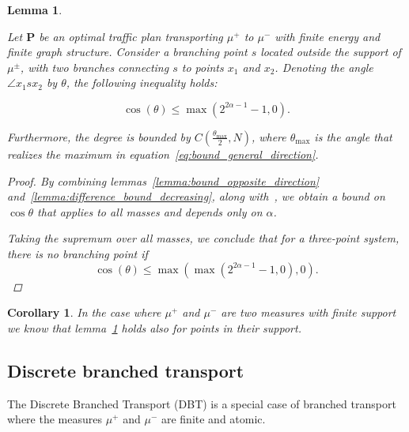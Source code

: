 \documentclass[11pt,reqno,a4paper]{amsart}
\numberwithin{equation}{section}
\theoremstyle{mytheorem}
\newtheorem{lemma}[subsection]{Lemma}
\newtheorem{corollary}[subsection]{Corollary}
\theoremstyle{myremark}
\theoremstyle{myparagraph}
\begin{document}
    \begin{lemma}
        \label{lemma:bound_general_direction}

        Let $\mathbf{P}$ be an optimal traffic plan transporting $\mu^+$ to $\mu^-$ with finite energy and finite graph structure.
        Consider a branching point $s$ located outside the support of $\mu^{\pm}$, with two branches connecting $s$ to points $x_1$ and $x_2$.
        Denoting the angle $\angle x_1 s x_2$ by $\theta$, the following inequality holds:

        \begin{equation}
            \label{eq:bound_general_direction}
            \cos(\theta) \le \max\left( 2^{2\alpha - 1} - 1, 0 \right).
        \end{equation}

        Furthermore, the degree is bounded by $C \left( \frac{\theta_{\max}}{2}, N \right)$, where $\theta_{\max}$
        is the angle that realizes the maximum in equation~\ref{eq:bound_general_direction}.

        \begin{proof}
            By combining lemmas~\ref{lemma:bound_opposite_direction} and~\ref{lemma:difference_bound_decreasing}, along with~\cite[Lemma 12.5]{Bernot}, we obtain a bound on $\cos \theta$ that applies to all masses and depends only on $\alpha$.

            Taking the supremum over all masses, we conclude that for a three-point system, there is no branching point if
            \begin{equation}
                \cos(\theta) \le \max \left( \max\left( 2^{2\alpha - 1} - 1, 0 \right), 0 \right).
            \end{equation}
        \end{proof}

    \end{lemma}

    \begin{corollary}
        In the case where $\mu^+$ and $\mu^-$ are two measures with finite support we know that lemma~\ref{lemma:bound_general_direction}
        holds also for points in their support.
    \end{corollary}

    \subsection{Discrete branched transport}

    The Discrete Branched Transport (DBT) is a special case of branched transport
    where the measures $\mu^+$ and $\mu^-$ are finite and atomic.
\end{document}
